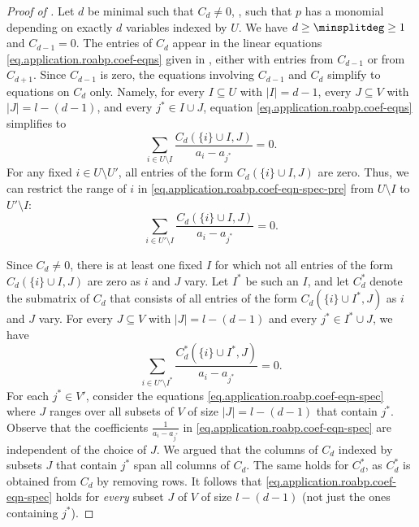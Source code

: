 \documentclass{toc}
\begin{document}
\begin{proof}[Proof of ]
  Let \(d\) be minimal such that \(C_d\ne 0\),
  \ie, such that \(p\) has a monomial depending on exactly \(d\) variables
  indexed by \(U\).
  We have \(d \ge \minsplitdeg \ge 1\) and \(C_{d-1} = 0\).
  The entries of \(C_d\) appear in the linear equations
  \eqref{eq.application.roabp.coef-eqns} given in
  ,
  either with entries from \(C_{d-1}\) or from \(C_{d+1}\).
  Since \(C_{d-1}\) is zero,
  the equations involving \(C_{d-1}\) and \(C_d\) simplify to equations on
  \(C_d\) only.
  Namely, for every \(I\subseteq U\) with \(|I|=d-1\),
  every \(J\subseteq V\) with \(|J|=l-(d-1)\),
  and every \(j^* \in I\cup J\),
  equation \eqref{eq.application.roabp.coef-eqns} simplifies to
  \begin{equation}\label{eq.application.roabp.coef-eqn-spec-pre}
    \sum_{i\in U\setminus I} \frac{C_d(\{i\}\cup I, J)}{a_i - a_{j^*}} = 0.
  \end{equation}
  For any fixed $i \in U \setminus U'$,
  all entries of the form $C_d(\{i\}\cup I, J)$ are zero.
  Thus, we can restrict the range of $i$ in
  \eqref{eq.application.roabp.coef-eqn-spec-pre}
  from $U \setminus I$ to $U' \setminus I$:
  \begin{equation}\label{eq.application.roabp.coef-eqn-spec-mid}
    \sum_{i\in U'\setminus I} \frac{C_d(\{i\}\cup I, J)}{a_i - a_{j^*}} = 0.
  \end{equation}

  Since $C_d \ne 0$,
  there is at least one fixed $I$ for which not all entries of the form
  $C_d(\{i\} \cup I, J)$ are zero as \(i\) and \(J\) vary.
  Let $I^*$ be such an $I$,
  and let $C^*_d$ denote the submatrix of $C_d$
  that consists of all entries of the form $C_d(\{i\}\cup I^*,J)$
  as \(i\) and \(J\) vary.
  For every $J \subseteq V$ with $|J|=l-(d-1)$
  and every $j^* \in I^* \cup J$,
  we have
  \begin{equation}\label{eq.application.roabp.coef-eqn-spec}
    \sum_{i\in U'\setminus I^*}
      \frac{C^*_d(\{i\}\cup I^*, J)}{a_i - a_{j^*}}
    = 0.
  \end{equation}
  For each $j^* \in V'$,
  consider the equations \eqref{eq.application.roabp.coef-eqn-spec}
  where $J$ ranges over all subsets of $V$ of size $|J| = l-(d-1)$
  that contain $j^*$.
  Observe that the coefficients $\frac{1}{a_i - a_{j^*}}$ in
  \eqref{eq.application.roabp.coef-eqn-spec} are independent of the choice of
  $J$.
  We argued that the columns of $C_d$ indexed by subsets $J$ that contain
  $j^*$ span all columns of $C_d$.
  The same holds for $C^*_d$,
  as $C^*_d$ is obtained from $C_d$ by removing rows.
  It follows that \eqref{eq.application.roabp.coef-eqn-spec} holds for
  \emph{every} subset $J$ of $V$ of size $l-(d-1)$
  (not just the ones containing $j^*$).


\end{proof}
\end{document}
